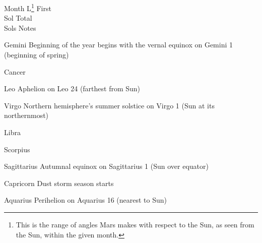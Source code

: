 {
    \bTABLE[split=repeat,option=stretch]
    \setupTABLE[column][5]
        [width=.52\textwidth,
        align=yes]
    \setupTABLE[row][each][align=center]
    \setupTABLE[5][1][align=center]

\bTABLEhead
    \bTR[bottomframe=on]
      \bTH  Month \eTH
      \bTH  L\footnote{This is the range of angles Mars makes with respect to the Sun, as seen from the Sun, within the given month.} \eTH
      \bTH  First\\Sol \eTH
      \bTH  Total\\Sols \eTH
      \bTH  Notes \eTH
    \eTR
\eTABLEhead

\bTABLEbody
    \bTR
      \bTC Gemini \eTC
      \bTC \math{[0,30^{\circ})}\eTC
       \eTC
       \eTC
      \bTC Beginning of the year begins with the vernal equinox on Gemini 1 (beginning of spring)\eTC
    \eTR
    
    \bTR
      \bTC Cancer \eTC
      \bTC \math{[30^{\circ},60^{\circ})} \eTC
       \eTC
       \eTC
      \bTC  \eTC
    \eTR
    
    \bTR
      \bTC Leo \eTC
      \bTC \math{[60^{\circ},90^{\circ})} \eTC
       \eTC
       \eTC
      \bTC Aphelion on Leo 24 (farthest from Sun)\eTC
    \eTR
    
    \bTR
      \bTC Virgo \eTC
      \bTC \math{[90^{\circ},120^{\circ})} \eTC
       \eTC
       \eTC
      \bTC Northern hemisphere's summer solstice on Virgo 1 (Sun at its northernmost)\eTC
    \eTR
    
    \bTR
      \bTC Libra \eTC
      \bTC \math{[120^{\circ},150^{\circ})} \eTC
       \eTC
       \eTC
      \bTC  \eTC
    \eTR
    
    \bTR
      \bTC Scorpius \eTC
      \bTC \math{[150^{\circ},180^{\circ})} \eTC
       \eTC
       \eTC
      \bTC  \eTC
    \eTR
    
    \bTR
      \bTC Sagittarius \eTC
      \bTC \math{[180^{\circ},210^{\circ})} \eTC
       \eTC
       \eTC
      \bTC Autumnal equinox on Sagittarius 1 (Sun over equator)\eTC
    \eTR
    
    \bTR
      \bTC Capricorn \eTC
      \bTC \math{[210^{\circ},240^{\circ})} \eTC
       \eTC
       \eTC
      \bTC Dust storm season starts \eTC
    \eTR
    
    \bTR
      \bTC Aquarius \eTC
      \bTC \math{[240^{\circ},270^{\circ})} \eTC
       \eTC
       \eTC
      \bTC Perihelion on Aquarius 16 (nearest to Sun)\eTC
    \eTR
    
}
